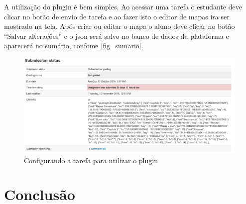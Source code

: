\documentclass[
	12pt,				%
	openright,			%
	oneside,			%
	a4paper,			%
	english,			%
	french,				%
	spanish,			%
	brazil				%
	]{abntex2}
\begin{document}
A utilização do plugin é bem simples. Ao acessar uma tarefa o estudante deve clicar no botão de envio de tarefa e ao fazer isto o editor de mapas ira ser mostrado na tela. Após criar ou editar o mapa o aluno deve clicar no botão “Salvar alterações” e o json será salvo no banco de dados da plataforma e aparecerá no sumário, confome \autoref{fig_sumario}.

\begin{figure}[htb]
	\caption{\label{fig_sumario} Configurando a tarefa para utilizar o plugin}
	\begin{center}
		\includegraphics[scale=0.4]{sumario.png}
	\end{center}
\end{figure}


\chapter{Conclusão}


\postextual



%
%
\end{document}
